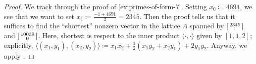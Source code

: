 \documentclass[../notes.tex]{subfiles}
\begin{document}
\begin{proof}
	We track through the proof of \cref{ex:primes-of-form-7}. Setting $x_0\coloneqq4691$, we see that we want to set $x_1\coloneqq\frac{-1+4691}2=2345$. Then the proof tells us that it suffices to find the ``shortest'' nonzero vector in the lattice $\Lambda$ spanned by $\begin{bsmallmatrix}
		2345 \\ 1
	\end{bsmallmatrix}$ and $\begin{bsmallmatrix}
		10039 \\ 0
	\end{bsmallmatrix}$. Here, shortest is respect to the inner product $\langle\cdot,\cdot\rangle$ given by $[1,1,2]$; explicitly, $\langle(x_1,y_1),(x_2,y_2)\rangle\coloneqq x_1x_2+\frac12(x_1y_2+x_2y_1)+2y_1y_2$. Anyway, we apply .
\end{proof}
\end{document}
